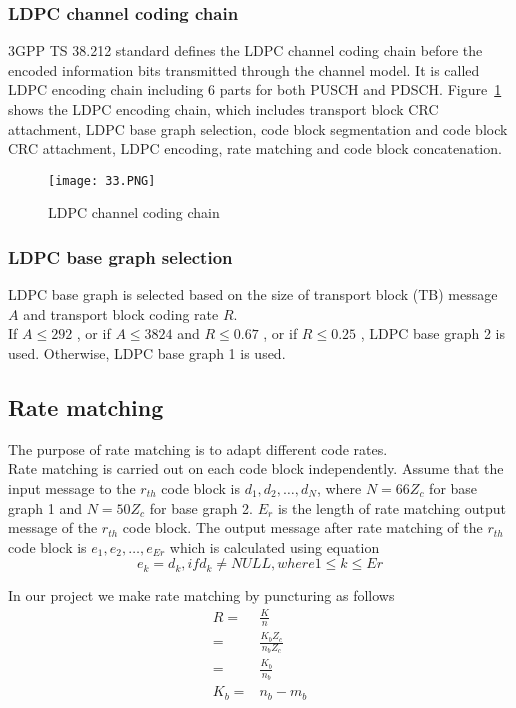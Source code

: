 \subsubsection{LDPC channel coding chain}
3GPP TS 38.212 standard defines the LDPC channel coding chain before the encoded information bits transmitted through the channel model. It is called LDPC encoding chain including 6 parts for both PUSCH and PDSCH. Figure~\ref{fig:coding chain} shows the LDPC encoding chain, which includes transport block CRC attachment, LDPC base graph selection, code block segmentation and code block CRC attachment, LDPC encoding, rate matching and code block concatenation. 

\begin{figure}[h]
\centering
\texttt{[image: 33.PNG]}
\caption{LDPC channel coding chain}
\label{fig:coding chain}
\end{figure}

\subsubsection{LDPC base graph selection}
LDPC base graph is selected based on the size of transport block (TB) message $A$ and transport block coding rate $R$. \\
If $A \leq 292$ , or if $A \leq 3824$ and $R \leq 0.67$ , or if $R \leq 0.25$ , LDPC base graph 2 is used. 
Otherwise, LDPC base graph 1 is used.

\subsection{Rate matching}
The purpose of rate matching is to adapt different code rates. \\
Rate matching is carried out on each code block independently. Assume that the input message to the $r_{th}$ code block is $d_1, d_2, \ldots , d_N$, where $N = 66Z_c$ for base graph 1 and $N = 50Z_c$ for base graph 2. $E_r$ is the length of rate matching output message of the $r_{th}$ code block. The output message after rate matching of the $r_{th}$ code block is $e_1, e_2, \ldots , e_{Er}$ which is calculated using equation
\[e_k = d_k, if d_k \neq NULL, where  1 \leq k \leq Er\] 

In our project we make rate matching by puncturing as follows
\begin{equation}
    \label{eq:rate}
    \begin{aligned}
        R = & \frac{K}{n} \\
        = & \frac{K_bZ_c}{n_bZ_c} \\
        = & \frac{K_b}{n_b} \\
        K_b = & n_b - m_b
    \end{aligned}
\end{equation}


